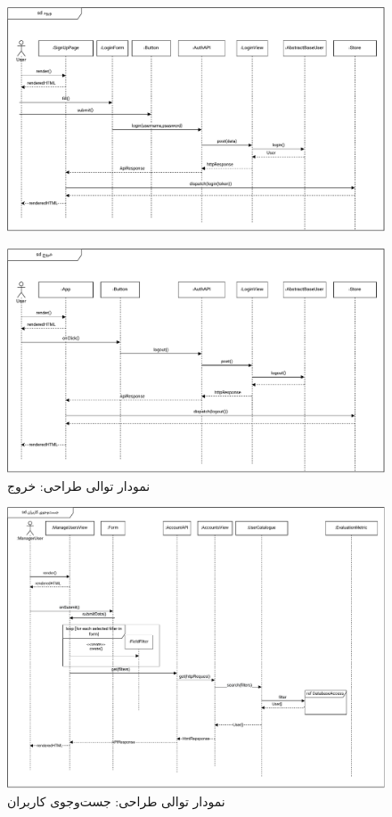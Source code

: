 \eject \pdfpagewidth=11in \pdfpageheight=7in
\begin{figure}[ht!]
	\centering
	\includegraphics[scale=0.8]{figs/design-sequence/3-2.pdf}
\end{figure}
\FloatBarrier
\newpage

\begin{figure}[ht!]
	\centering
	\includegraphics[scale=0.8]{figs/design-sequence/3-3.pdf}
	\caption{نمودار توالی طراحی: خروج}
\end{figure}
\FloatBarrier
\newpage

\eject \pdfpagewidth=11in \pdfpageheight=9in
\begin{figure}[ht!]
	\centering
	\includegraphics[scale=0.8]{figs/design-sequence/3-4.pdf}
	\caption{نمودار توالی طراحی: جست‌وجوی کاربران}
\end{figure}
\FloatBarrier
\newpage

